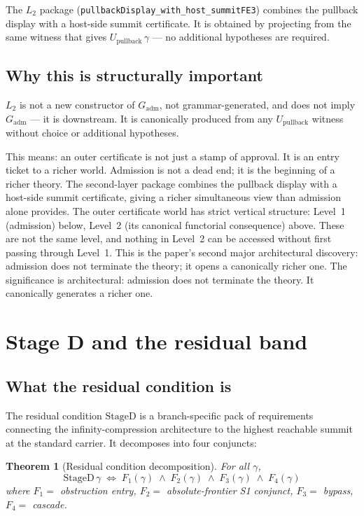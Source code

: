 \documentclass[11pt]{article}
\theoremstyle{plain}
\newtheorem{theorem}{Theorem}[section]
\theoremstyle{definition}
\theoremstyle{remark}
\newcommand{\Gadm}{G_{\mathrm{adm}}}
\newcommand{\Upb}{U_{\mathrm{pullback}}}
\newcommand{\Stwo}{L_2}
\newcommand{\StageD}{\mathrm{StageD}}
\newcommand{\lean}[1]{\texttt{\small #1}}
\begin{document}
The $\Stwo$ package (\lean{pullbackDisplay\_with\_host\_summitFE3}) combines
the pullback display with a host-side summit certificate.  It is
obtained by projecting from the same witness that gives $\Upb\,\gamma$
--- no additional hypotheses are required.

\subsection{Why this is structurally important}

$\Stwo$ is not a new constructor of $\Gadm$, not grammar-generated, and
does not imply $\Gadm$ --- it is downstream.  It is canonically produced
from any $\Upb$ witness without choice or additional hypotheses.

This means: an outer certificate is not just a stamp of approval.  It is
an entry ticket to a richer world.  Admission is not a dead end; it is the
beginning of a richer theory.  The second-layer package combines the
pullback display with a host-side summit certificate, giving a richer
simultaneous view than admission alone provides.  The outer certificate
world has strict vertical structure: Level~1 (admission) below, Level~2
(its canonical functorial consequence) above.  These are not the same level,
and nothing in Level~2 can be accessed without first passing through Level~1.
This is the paper's second major architectural discovery: admission does not
terminate the theory; it opens a canonically richer one.
The significance is architectural: admission does not terminate the theory.
It canonically generates a richer one.

\section{Stage D and the residual band}
\label{sec:residual}

\subsection{What the residual condition is}

The residual condition $\StageD$ is a branch-specific pack of requirements
connecting the infinity-compression architecture to the highest reachable
summit at the standard carrier.  It decomposes into four conjuncts:

\begin{theorem}[Residual condition decomposition]
\label{thm:staged-d}
  For all $\gamma$,
  \[
    \StageD\,\gamma
    \;\iff\;
    F_1(\gamma) \;\wedge\; F_2(\gamma) \;\wedge\; F_3(\gamma) \;\wedge\; F_4(\gamma)
  \]
  where $F_1 =$ obstruction entry, $F_2 =$ absolute-frontier S1
  conjunct, $F_3 =$ bypass, $F_4 =$ cascade.
\end{theorem}
\end{document}
